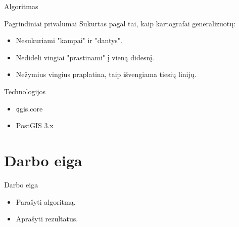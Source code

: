 \documentclass[14pt]{beamer}
\begin{document}
\begin{frame}{Algoritmas}
    \begin{center}
    \end{center}
\end{frame}

\begin{frame}{Pagrindiniai privalumai}
    Sukurtas pagal tai, kaip kartografai generalizuotų:
    \pause
    \begin{itemize}[<+->]
        \item Nesukuriami "kampai" ir "dantys".
        \item Nedideli vingiai "prastinami" į vieną didesnį.
        \item Nežymius vingius praplatina, taip išvengiama tiesių linijų.
    \end{itemize}
\end{frame}

\begin{frame}{Technologijos}
    \begin{itemize}[<+->]
        \item {\texttt qgis.core}
        \item PostGIS 3.x
    \end{itemize}
\end{frame}

\section{Darbo eiga}

\begin{frame}{Darbo eiga}
    \begin{itemize}[<+->]
        \item Parašyti algoritmą.
        \item Aprašyti rezultatus.
    \end{itemize}
\end{frame}
\end{document}
